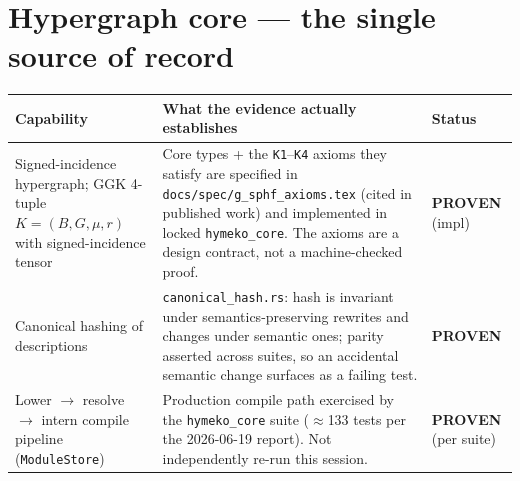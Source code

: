\documentclass[11pt]{article}
\makeatletter
\newcommand{\sProven}{\textcolor{green!55!black}{\textbf{PROVEN}}}
\newcommand{\qual}[1]{{\footnotesize #1}}
\newcommand{\code}[1]{\texttt{\small #1}}
\newenvironment{captable}{%
  \begin{longtable}{@{}p{4.9cm}p{8.1cm}>{\raggedright\arraybackslash}p{2.5cm}@{}}
  \toprule
  \textbf{Capability} & \textbf{What the evidence actually establishes} & \textbf{Status}\\
  \midrule\endhead}{%
  \bottomrule\end{longtable}}
\makeatother
\begin{document}
\section{Hypergraph core --- the single source of record}
\begin{captable}
Signed-incidence hypergraph; GGK 4-tuple $K=(B,G,\mu,r)$ with signed-incidence tensor
  & Core types + the \code{K1}--\code{K4} axioms they satisfy are specified in
    \code{docs/spec/g\_sphf\_axioms.tex} (cited in published work) and implemented in locked
    \code{hymeko\_core}. The axioms are a design contract, not a machine-checked proof.
  & \sProven{} \qual{(impl)}\\
\addlinespace
Canonical hashing of descriptions
  & \code{canonical\_hash.rs}: hash is invariant under semantics-preserving rewrites and
    changes under semantic ones; parity asserted across suites, so an accidental semantic
    change surfaces as a failing test.
  & \sProven\\
\addlinespace
Lower $\to$ resolve $\to$ intern compile pipeline (\code{ModuleStore})
  & Production compile path exercised by the \code{hymeko\_core} suite ($\approx$133 tests
    per the 2026-06-19 report). Not independently re-run this session.
  & \sProven{} \qual{(per suite)}\\
\end{captable}
\end{document}
